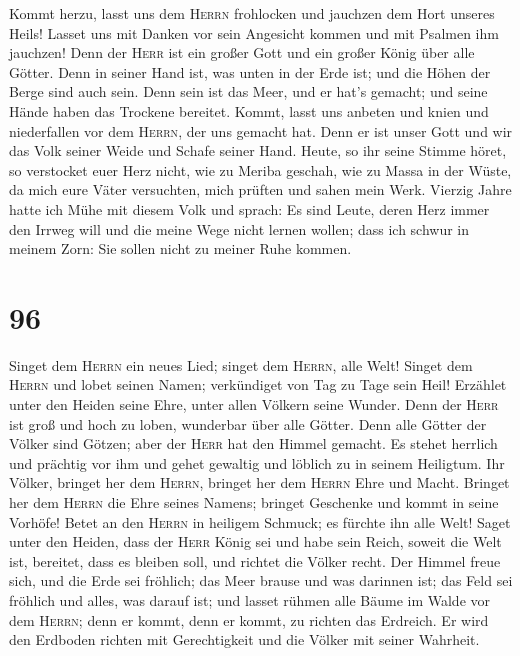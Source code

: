  Kommt herzu, lasst uns dem \textsc{Herrn} frohlocken und
jauchzen dem Hort unseres Heils!  Lasset uns mit Danken
vor sein Angesicht kommen und mit Psalmen ihm jauchzen! 
Denn der \textsc{Herr} ist ein großer Gott und ein großer König über
alle Götter.  Denn in seiner Hand ist, was unten in der
Erde ist; und die Höhen der Berge sind auch sein.  Denn
sein ist das Meer, und er hat's gemacht; und seine Hände haben das
Trockene bereitet.  Kommt, lasst uns anbeten und knien und
niederfallen vor dem \textsc{Herrn}, der uns gemacht hat. 
Denn er ist unser Gott und wir das Volk seiner Weide und Schafe seiner
Hand. Heute, so ihr seine Stimme höret,  so verstocket
euer Herz nicht, wie zu Meriba geschah, wie zu Massa in der Wüste,
 da mich eure Väter versuchten, mich prüften und sahen
mein Werk.  Vierzig Jahre hatte ich Mühe mit diesem Volk
und sprach: Es sind Leute, deren Herz immer den Irrweg will und die
meine Wege nicht lernen wollen;  dass ich schwur in
meinem Zorn: Sie sollen nicht zu meiner Ruhe kommen.

\hypertarget{section-95}{%
\section{96}\label{section-95}}

 Singet dem \textsc{Herrn} ein neues Lied; singet dem
\textsc{Herrn}, alle Welt!  Singet dem \textsc{Herrn} und
lobet seinen Namen; verkündiget von Tag zu Tage sein Heil!
 Erzählet unter den Heiden seine Ehre, unter allen Völkern
seine Wunder.  Denn der \textsc{Herr} ist groß und hoch zu
loben, wunderbar über alle Götter.  Denn alle Götter der
Völker sind Götzen; aber der \textsc{Herr} hat den Himmel gemacht.
 Es stehet herrlich und prächtig vor ihm und gehet
gewaltig und löblich zu in seinem Heiligtum.  Ihr Völker,
bringet her dem \textsc{Herrn}, bringet her dem \textsc{Herrn} Ehre und
Macht.  Bringet her dem \textsc{Herrn} die Ehre seines
Namens; bringet Geschenke und kommt in seine Vorhöfe! 
Betet an den \textsc{Herrn} in heiligem Schmuck; es fürchte ihn alle
Welt!  Saget unter den Heiden, dass der \textsc{Herr}
König sei und habe sein Reich, soweit die Welt ist, bereitet, dass es
bleiben soll, und richtet die Völker recht.  Der Himmel
freue sich, und die Erde sei fröhlich; das Meer brause und was darinnen
ist;  das Feld sei fröhlich und alles, was darauf ist;
und lasset rühmen alle Bäume im Walde  vor dem
\textsc{Herrn}; denn er kommt, denn er kommt, zu richten das Erdreich.
Er wird den Erdboden richten mit Gerechtigkeit und die Völker mit seiner
Wahrheit.

